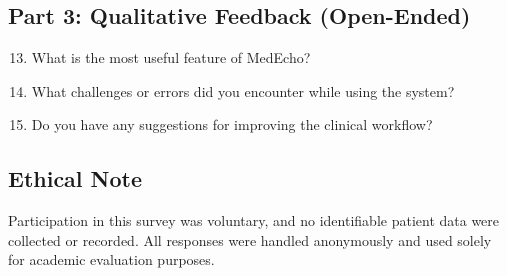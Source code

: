 \documentclass[12pt,a4paper]{report}
\begin{document}
\subsection*{Part 3: Qualitative Feedback (Open-Ended)}

\begin{enumerate}
    \setcounter{enumi}{12}
    \item What is the most useful feature of MedEcho?
    \vspace{1.5cm}
    \item What challenges or errors did you encounter while using the system?
    \vspace{1.5cm}
    \item Do you have any suggestions for improving the clinical workflow?
    \vspace{1.5cm}
\end{enumerate}

\vspace{0.5cm}

\subsection*{Ethical Note}
Participation in this survey was voluntary, and no identifiable patient data were collected or recorded. All responses were handled anonymously and used solely for academic evaluation purposes.

\clearpage
\end{document}
